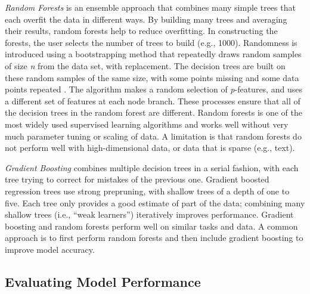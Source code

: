
\emph{Random Forests} is an ensemble approach that combines many simple trees 
that each overfit the data in different ways. By building many trees and 
averaging their results, random forests help to reduce overfitting. In 
constructing the forests, the user selects the number of trees to build 
(e.g., 1000). Randomness is introduced using a bootstrapping method that 
repeatedly draws random samples of size \textit{n} from the data set, with 
replacement. The decision trees are built on these random samples 
of the same size, with some points missing and some data points repeated 
\cite{muller17,raschka17}. The algorithm makes a random selection of 
\textit{p}-features, and uses a different set of features at each node branch. 
These processes ensure that all of the decision trees in the random forest are 
different. Random forests is one of the most widely used supervised learning 
algorithms and works well without very much parameter tuning or scaling of data. 
A limitation is that random forests do not perform well with high-dimensional 
data, or data that is sparse (e.g., text).


\emph{Gradient Boosting} combines multiple decision trees in a serial fashion, 
with each tree trying to correct for mistakes of the previous one. Gradient 
boosted regression trees use strong prepruning, with shallow trees of a depth 
of one to five. Each tree only provides a good estimate of part of the data; 
combining many shallow trees (i.e., ``weak learners'') iteratively improves 
performance. Gradient boosting and random forests perform well on similar tasks 
and data. A common approach is to first perform random forests and then include 
gradient boosting to improve model accuracy. 




\subsection{Evaluating Model Performance}

